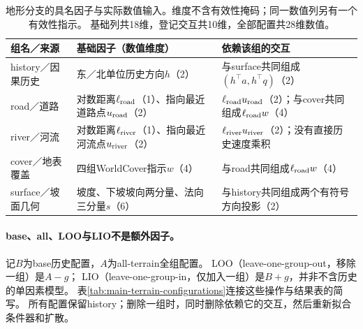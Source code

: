\begin{table}[!htbp]\centering\small
\caption{地形分支的具名因子与实际数值输入。维度不含有效性掩码；同一数值列另有一个有效性指示。
基础列共18维，登记交互共10维，全部配置共28维数值。}
\label{tab:main-terrain-factors}
\begin{tabular}{@{}p{.17\linewidth}p{.43\linewidth}p{.32\linewidth}@{}}\toprule
组名／来源 & 基础因子（数值维度） & 依赖该组的交互\\\midrule
history／因果历史 & 东／北单位历史方向$h$（2） & 与surface共同组成$(h^\top a,h^\top q)$（2）\\
road／道路 & 对数距离$\ell_{\rm road}$（1）、指向最近道路点$u_{\rm road}$（2） & $\ell_{\rm road}u_{\rm road}$（2）；与cover共同组成$\ell_{\rm road}w$（4）\\
river／河流 & 对数距离$\ell_{\rm river}$（1）、指向最近河流点$u_{\rm river}$（2） & $\ell_{\rm river}u_{\rm river}$（2）；没有直接历史速度乘积\\
cover／地表覆盖 & 四组WorldCover指示$w$（4） & 与road共同组成$\ell_{\rm road}w$（4）\\
surface／坡面几何 & 坡度、下坡坡向两分量、法向三分量$s$（6） & 与history共同组成两个有符号方向投影（2）\\\bottomrule
\end{tabular}\end{table}

\paragraph{base、all、LOO与LIO不是额外因子。}
记$B$为base历史配置，$A$为all-terrain全组配置。
LOO（leave-one-group-out，移除一组）是$A-g$；
LIO（leave-one-group-in，仅加入一组）是$B+g$，并非不含历史的单因素模型。
表\ref{tab:main-terrain-configurations}连接这些操作与结果表的简写。
所有配置保留history；删除一组时，同时删除依赖它的交互，然后重新拟合条件器和扩散。


